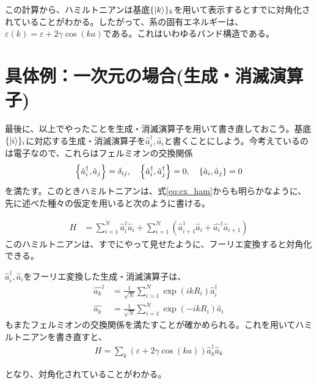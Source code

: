 \documentclass[uplatex,dvipdfmx]{jsarticle}
\newcommand{\crt}[1]{\hat{#1}^\dagger}
\newcommand{\anh}[1]{\hat{#1}}
\begin{document}
    この計算から、ハミルトニアンは基底$\{\ket{k}\}_{k}$を用いて表示するとすでに対角化されていることがわかる。したがって、系の固有エネルギーは、$\varepsilon(k) = \varepsilon + 2\gamma \cos(ka)$である。これはいわゆるバンド構造である。

    \section{具体例：一次元の場合(生成・消滅演算子)}
    最後に、以上でやったことを生成・消滅演算子を用いて書き直しておこう。基底$\{\ket{i}\}_{i}$に対応する生成・消滅演算子を$\crt{a}_i, \anh{a}_i$と書くことにしよう。今考えているのは電子なので、これらはフェルミオンの交換関係
    \begin{align}
        \acomm{\crt{a}_i}{\anh{a}_j} = \delta_{ij}, \quad 
        \acomm{\crt{a}_i}{\crt{a}_j} = 0 , \quad \acomm{\anh{a}_i}{\anh{a}_j} = 0        
    \end{align}
    を満たす。このときハミルトニアンは、式\ref{eq:ex_ham}からも明らかなように、先に述べた種々の仮定を用いると次のように書ける。
    
    \begin{align}
        H &= \sum_{i=1}^N \crt{a}_i\anh{a}_i + \sum_{i=1}^N \left(\crt{a}_{i+1}\anh{a}_{i} + \crt{a_{i}}\anh{a}_{i+1} \right)
    \end{align}
    このハミルトニアンは、すでにやって見せたように、フーリエ変換すると対角化できる。

    $\crt{a}_i, \anh{a}_i$をフーリエ変換した生成・消滅演算子は、
    \begin{align}
        \crt{a_k} &= \frac{1}{\sqrt{N}} \sum_{i=1}^N \exp(ikR_i)\crt{a}_i \\
        \anh{a_k} &= \frac{1}{\sqrt{N}} \sum_{i=1}^N \exp(-ikR_i)\anh{a}_i        
    \end{align}
    もまたフェルミオンの交換関係を満たすことが確かめられる。これを用いてハミルトニアンを書き直すと、
    \begin{align}
        H = \sum_k \left(\varepsilon+2\gamma \cos(ka) \right)\crt{a}_k \anh{a}_k
    \end{align}

    となり、対角化されていることがわかる。
\end{document}
